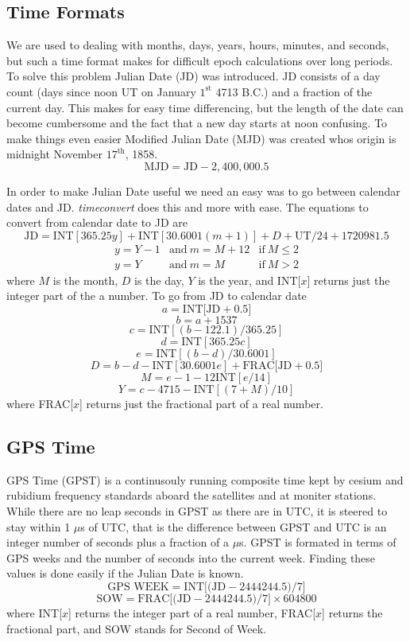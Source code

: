 \documentclass{src/manual}
\begin{document}
\subsection{Time Formats}
We are used to dealing with months, days, years, hours, minutes, and seconds, but such a time format makes for difficult epoch calculations over long periods. To solve this problem Julian Date (JD) was introduced. JD consists of a day count (days since noon UT on January $1^{\mbox{st}}$ 4713 B.C.) and a fraction of the current day. This makes for easy time differencing, but the length of the date can become cumbersome and the fact that a new day starts at noon confusing. To make things even easier Modified Julian Date (MJD) was created whos origin is midnight November $17^{\mbox{th}}$, 1858.
\[ \mbox{MJD}=\mbox{JD}-2,400,000.5 \]

In order to make Julian Date useful we need an easy was to go between calendar dates and JD. \emph{timeconvert} does this and more with ease. The equations to convert from calendar date to JD are
\[ \mbox{JD}=\mbox{INT}[365.25y]+\mbox{INT}[30.6001(m+1)]+D+\mbox{UT}/24+1720981.5\]
\[ \begin{array}{lll}
y=Y-1 & \mbox{and}~m=M+12 & \mbox{if}~M \leq2 \\
y=Y & \mbox{and}~m=M & \mbox{if}~M > 2
\end{array} \]
where $M$ is the month, $D$ is the day, $Y$ is the year, and INT[$x$] returns just the integer part of the a number. To go from JD to calendar date
\[ a=\mbox{INT[JD}+0.5] \]
\[ b=a+1537 \]
\[ c=\mbox{INT}[(b-122.1)/365.25] \]
\[ d=\mbox{INT}[365.25c] \]
\[ e=\mbox{INT}[(b-d)/30.6001] \]
\[ D=b-d-\mbox{INT}[30.6001e]+\mbox{FRAC[JD}+0.5] \]
\[ M=e-1-12\mbox{INT}[e/14] \]
\[ Y=c-4715-\mbox{INT}[(7+M)/10] \]
where FRAC[$x$] returns just the fractional part of a real number.
\subsection{GPS Time}
GPS Time (GPST) is a continusouly running composite time kept by cesium and rubidium frequency standards aboard the satellites and at moniter stations. While there are no leap seconds in GPST as there are in UTC, it is steered to stay within 1 $\mu$s of UTC, that is the difference between GPST and UTC is an integer number of seconds plus a fraction of a $\mu$s. GPST is formated in terms of GPS weeks and the number of seconds into the current week. Finding these values is done easily if the Julian Date is known.
\[ \mbox{GPS WEEK}=\mbox{INT[(JD}-2444244.5)/7] \]
\[ \mbox{SOW}=\mbox{FRAC[(JD}-2444244.5)/7]\times 604800 \]
where INT[$x$] returns the integer part of a real number, FRAC[$x$] returns the fractional part, and SOW stands for Second of Week.
\end{document}
